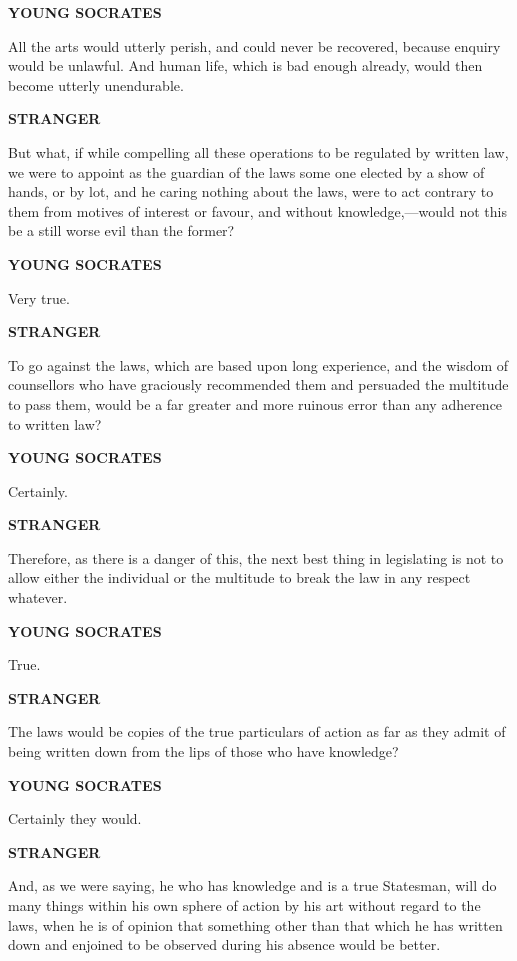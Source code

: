\documentclass[11pt,letter]{article}
\begin{document}
\par \textbf{YOUNG SOCRATES}
\par   All the arts would utterly perish, and could never be recovered, because enquiry would be unlawful. And human life, which is bad enough already, would then become utterly unendurable.

\par \textbf{STRANGER}
\par   But what, if while compelling all these operations to be regulated by written law, we were to appoint as the guardian of the laws some one elected by a show of hands, or by lot, and he caring nothing about the laws, were to act contrary to them from motives of interest or favour, and without knowledge,—would not this be a still worse evil than the former?

\par \textbf{YOUNG SOCRATES}
\par   Very true.

\par \textbf{STRANGER}
\par   To go against the laws, which are based upon long experience, and the wisdom of counsellors who have graciously recommended them and persuaded the multitude to pass them, would be a far greater and more ruinous error than any adherence to written law?

\par \textbf{YOUNG SOCRATES}
\par   Certainly.

\par \textbf{STRANGER}
\par   Therefore, as there is a danger of this, the next best thing in legislating is not to allow either the individual or the multitude to break the law in any respect whatever.

\par \textbf{YOUNG SOCRATES}
\par   True.

\par \textbf{STRANGER}
\par   The laws would be copies of the true particulars of action as far as they admit of being written down from the lips of those who have knowledge?

\par \textbf{YOUNG SOCRATES}
\par   Certainly they would.

\par \textbf{STRANGER}
\par   And, as we were saying, he who has knowledge and is a true Statesman, will do many things within his own sphere of action by his art without regard to the laws, when he is of opinion that something other than that which he has written down and enjoined to be observed during his absence would be better.
\end{document}
